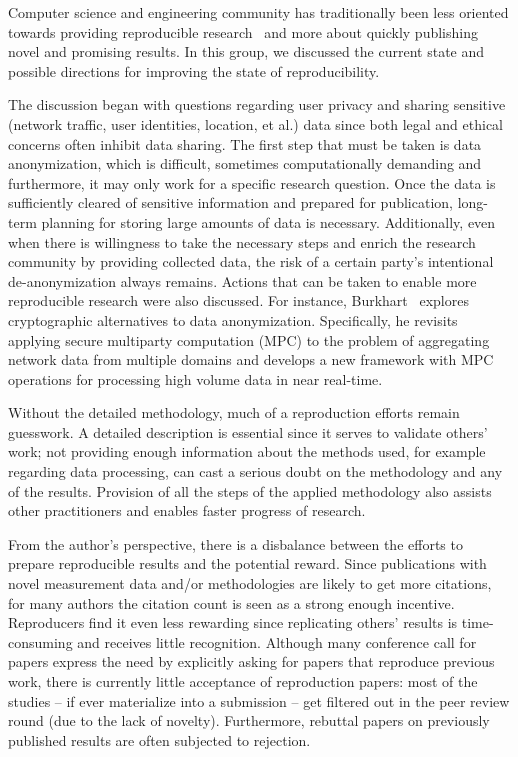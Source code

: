 Computer science and engineering community has traditionally been less
oriented towards providing reproducible
research~\cite{vbajpai:reproducibility:2017, qscheitle:reproducibility:2017}
and more about quickly publishing novel and promising results. In this group,
we discussed the current state and possible directions for improving the state
of reproducibility.

The discussion began with questions regarding user privacy and sharing
sensitive (network traffic, user identities, location, et al.) data since both
legal and ethical concerns often inhibit data sharing. The first step that
must be taken is data anonymization, which is difficult, sometimes
computationally demanding and furthermore, it may only work for a specific
research question. Once the data is sufficiently cleared of sensitive
information and prepared for publication, long-term planning for storing large
amounts of data is necessary.  Additionally, even when there is willingness to
take the necessary steps and enrich the research community by providing
collected data, the risk of a certain party's intentional de-anonymization
always remains. Actions that can be taken to enable more reproducible research
were also discussed. For instance, Burkhart~\cite{burkhart2011thesis} explores
cryptographic alternatives to data anonymization. Specifically, he revisits
applying secure multiparty computation (MPC) to the problem of aggregating
network data from multiple domains and develops a new framework with MPC
operations for processing high volume data in near real-time.

Without the detailed methodology, much of a reproduction efforts remain
guesswork. A detailed description is essential since it serves to validate
others' work; not providing enough information about the methods used, for
example regarding data processing, can cast a serious doubt on the methodology
and any of the results.  Provision of all the steps of the applied methodology
also assists other practitioners and enables faster progress of research.

From the author's perspective, there is a disbalance between the efforts to
prepare reproducible results and the potential reward. Since publications with
novel measurement data and/or methodologies are likely to get more citations,
for many authors the citation count is seen as a strong enough incentive.
Reproducers find it even less rewarding since replicating others' results is
time-consuming and receives little recognition. Although many conference call
for papers express the need by explicitly asking for papers that reproduce
previous work, there is currently little acceptance of reproduction papers:
most of the studies -- if ever materialize into a submission -- get filtered
out in the peer review round (due to the lack of novelty). Furthermore,
rebuttal papers on previously published results are often subjected to
rejection.

